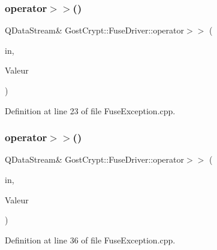 \subsubsection{\texorpdfstring{operator$>$$>$()}{operator>>()}\hspace{0.1cm}{\footnotesize\ttfamily [1/6]}}
{\footnotesize\ttfamily Q\+Data\+Stream\& Gost\+Crypt\+::\+Fuse\+Driver\+::operator$>$$>$ (\begin{DoxyParamCaption}\item[{Q\+Data\+Stream \&}]{in,  }\item[{\hyperlink{class_gost_crypt_1_1_fuse_driver_1_1_fuse_exception}{Gost\+Crypt\+::\+Fuse\+Driver\+::\+Fuse\+Exception} \&}]{Valeur }\end{DoxyParamCaption})}



Definition at line 23 of file Fuse\+Exception.\+cpp.

\mbox{\label{namespace_gost_crypt_1_1_fuse_driver_aac35951e14fe8c2f225f128bc57cf3f5}} 
\subsubsection{\texorpdfstring{operator$>$$>$()}{operator>>()}\hspace{0.1cm}{\footnotesize\ttfamily [2/6]}}
{\footnotesize\ttfamily Q\+Data\+Stream\& Gost\+Crypt\+::\+Fuse\+Driver\+::operator$>$$>$ (\begin{DoxyParamCaption}\item[{Q\+Data\+Stream \&}]{in,  }\item[{\hyperlink{class_gost_crypt_1_1_fuse_driver_1_1_fuse_timeout}{Gost\+Crypt\+::\+Fuse\+Driver\+::\+Fuse\+Timeout} \&}]{Valeur }\end{DoxyParamCaption})}



Definition at line 36 of file Fuse\+Exception.\+cpp.

\mbox{\label{namespace_gost_crypt_1_1_fuse_driver_ab0890a02b7136c5259cf71c93d0095ef}} 
